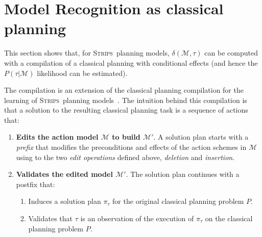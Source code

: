 \documentclass[letterpaper]{article} %
\newcommand{\strips}{\textsc{Strips}}     %
\begin{document}
\section{Model Recognition as classical planning}
This section shows that, for \strips\ planning models, $\delta(\mathcal{M},\tau)$ can be computed with a compilation of a classical planning with conditional effects (and hence the $P(\tau|\mathcal{M})$ likelihood can be estimated).

The compilation is an extension of the classical planning compilation for the learning of \strips\ planning models~\cite{aineto2018learning}. The intuition behind this compilation is that a solution to the resulting classical planning task is a sequence of actions that:
\begin{enumerate}
\item {\bf Edits the action model $\mathcal{M}$ to build $\mathcal{M}'$}. A solution plan starts with a {\em prefix} that modifies the preconditions and effects of the action schemes in $\mathcal{M}$ using to the two {\em edit operations} defined above, {\em deletion} and {\em insertion}. 
\item {\bf Validates the edited model $\mathcal{M}'$}. The solution plan continues with a postfix that:
\begin{enumerate}
\item Induces a solution plan $\pi_\tau$ for the original classical planning problem $P$.
\item Validates that $\tau$ is an observation of the execution of $\pi_\tau$ on the classical planning problem $P$.
\end{enumerate}
\end{enumerate}
\end{document}
